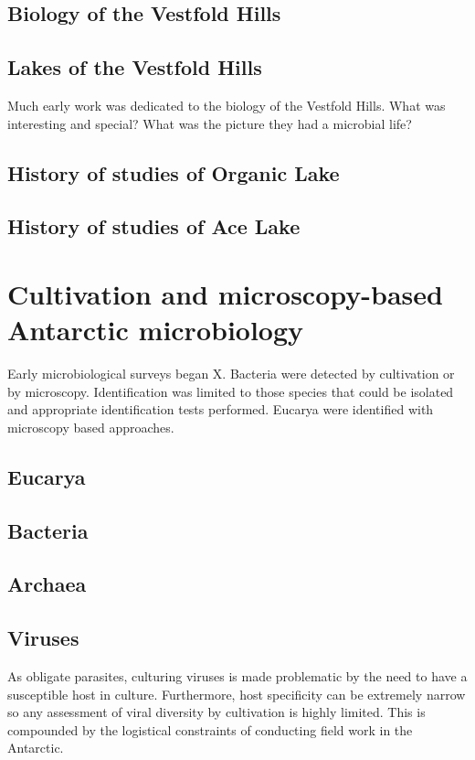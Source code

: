 \subsection{Biology of the Vestfold Hills}

\subsection{Lakes of the Vestfold Hills}

Much early work was dedicated to the biology of the Vestfold Hills.
What was interesting and special?
What was the picture they had a microbial life?

\subsection{History of studies of Organic Lake}
\subsection{History of studies of Ace Lake}


\section{Cultivation and microscopy-based Antarctic microbiology}

Early microbiological surveys began X.
Bacteria were detected by cultivation or by microscopy. 
Identification was limited to those species that could be isolated and appropriate identification tests performed.
Eucarya were identified with microscopy based approaches.


\subsection{Eucarya}

\subsection{Bacteria}

\subsection{Archaea}

\subsection{Viruses}
As obligate parasites, culturing viruses is made problematic by the need to have a susceptible host in culture.
Furthermore, host specificity can be extremely narrow so any assessment of viral diversity by cultivation is highly limited.
This is compounded by the logistical constraints of conducting field work in the Antarctic.


